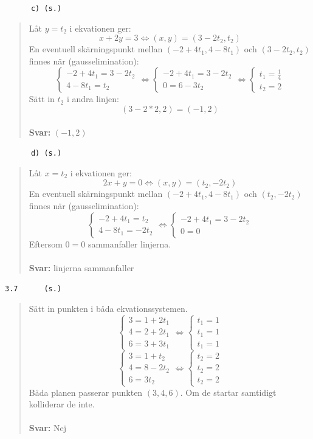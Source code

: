 \documentclass[a4paper]{article}
\newcommand{\tskcol}[1]{\textcolor{tskcol}{#1}}
\begin{document}
\texttt{\tskcol{~~~~~~c) (s.)}}
\begin{quotation}
	\noindent
	Låt $y=t_2$ i ekvationen ger:
	\[x+2y=3\Leftrightarrow
	(x,y)=(3-2t_2,t_2)\]
	En eventuell skärningspunkt mellan $(-2+4t_1,4-8t_1)$ och $(3-2t_2,t_2)$ finnes när (gausselimination):
	\[\begin{cases}
	-2+4t_1=3-2t_2 \\
	4-8t_1=t_2
	\end{cases} \Leftrightarrow
	\begin{cases}
	-2+4t_1=3-2t_2 \\
	0=6-3t_2
	\end{cases} \Leftrightarrow
	\begin{cases}
	t_1=\frac{1}{4} \\
	t_2=2
	\end{cases}\]
	Sätt in $t_2$ i andra linjen:
	\[(3-2*2,2)=(-1,2)\]
	\\
	\textbf{Svar:} $(-1,2)$
\end{quotation}

\texttt{\tskcol{~~~~~~d) (s.)}}
\begin{quotation}
	\noindent
	Låt $x=t_2$ i ekvationen ger:
	\[2x+y=0\Leftrightarrow
	(x,y)=(t_2,-2t_2)\]
	En eventuell skärningspunkt mellan $(-2+4t_1,4-8t_1)$ och $(t_2,-2t_2)$ finnes när (gausselimination):
	\[\begin{cases}
	-2+4t_1=t_2 \\
	4-8t_1=-2t_2
	\end{cases} \Leftrightarrow
	\begin{cases}
	-2+4t_1=3-2t_2 \\
	0=0
	\end{cases}\]
	Eftersom $0=0$ sammanfaller linjerna.
	\\ \\
	\textbf{Svar:} linjerna sammanfaller
\end{quotation}

\texttt{\tskcol{3.7~~~~~ (s.)}}
\begin{quotation}
	\noindent
	Sätt in punkten i båda ekvationssystemen.
	\[\begin{cases}
	3=1+2t_1 \\
	4=2+2t_1 \\
	6=3+3t_1
	\end{cases} \Leftrightarrow
	\begin{cases}
	t_1=1 \\
	t_1=1 \\
	t_1=1
	\end{cases}\]
	\[\begin{cases}
	3=1+t_2 \\
	4=8-2t_2 \\
	6=3t_2
	\end{cases} \Leftrightarrow
	\begin{cases}
	t_2=2 \\
	t_2=2 \\
	t_2=2
	\end{cases}\]
	Båda planen passerar punkten $(3,4,6)$. 
	Om de startar samtidigt kolliderar de inte.
	\\ \\
	\textbf{Svar:} Nej
\end{quotation}
\end{document}
